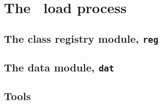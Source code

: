 \chapter{The \PM\ load process}

\section{The class registry module, \texttt{reg}}

\section{The data module, \texttt{dat}}

\section{Tools}
